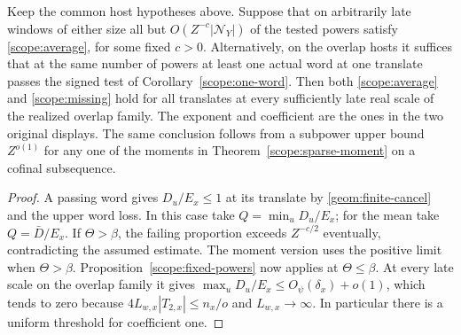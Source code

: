 \begin{corollary}\label{scope:sparse-transfer}
Keep the common host hypotheses above. Suppose that on arbitrarily
late windows of either size all but \(O(Z^{-c}|\mathcal N_Y|)\) of the tested
powers satisfy \eqref{scope:average}, for some fixed \(c>0\).
Alternatively, on the overlap hosts it suffices that at the same
number of powers at least one actual word at one translate passes
the signed test of Corollary~\ref{scope:one-word}.
Then both \eqref{scope:average} and \eqref{scope:missing} hold for
all translates at every sufficiently late real scale of the
realized overlap family. The exponent and coefficient are the ones
in the two original displays. The same conclusion follows from
a subpower upper bound \(Z^{o(1)}\) for any one of the moments
in Theorem~\ref{scope:sparse-moment} on a cofinal subsequence.
\end{corollary}
\begin{proof}
A passing word gives \(D_u/E_x\le1\) at its translate by
\eqref{geom:finite-cancel} and the upper word loss. In this case
take \(Q=\min_u D_u/E_x\); for the mean take \(Q=\bar D/E_x\).
If \(\Theta>\beta\), the failing proportion exceeds \(Z^{-c/2}\)
eventually, contradicting the assumed estimate. The moment version
uses the positive limit when \(\Theta>\beta\).
Proposition~\ref{scope:fixed-powers} now applies at \(\Theta\le\beta\).
At every late scale on the overlap family it gives
\(\max_u D_u/E_x\le O_\psi(\delta_x)+o(1)\), which tends to zero
because \(4L_{w,x}|T_{2,x}|\le n_x/o\) and \(L_{w,x}\to\infty\).
In particular there is a uniform threshold for coefficient one.
\end{proof}

